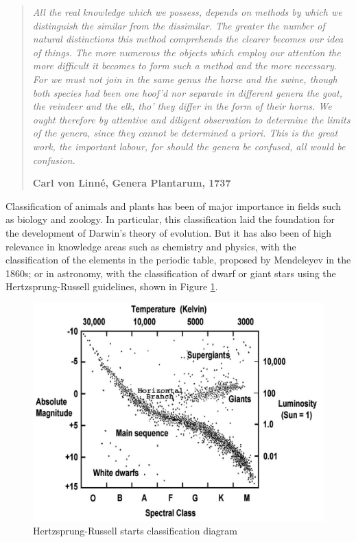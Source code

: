 \begin{quotation}{\slshape
		All the real knowledge which we possess, depends on methods by which we distinguish the similar from the dissimilar. The greater the number of natural distinctions this method comprehends the clearer becomes our idea of things. The
		more numerous the objects which employ our attention the more difficult it becomes to
		form such a method and the more necessary.
		For we must not join in the same genus the horse and the swine, though both species
		had been one hoof’d nor separate in different genera the goat, the reindeer and the elk,
		tho’ they differ in the form of their horns. We ought therefore by attentive and diligent
		observation to determine the limits of the genera, since they cannot be determined a
		priori. This is the great work, the important labour, for should the genera be confused,
		all would be confusion.} 
		\begin{flushright}
			\textbf{Carl von Linné, Genera Plantarum, 1737}
		\end{flushright}
\end{quotation}

Classification of animals and plants has been of major importance in fields such as biology and zoology. In particular, this classification laid the foundation for the development of Darwin's theory of evolution. But it has also been of high relevance in knowledge areas such as chemistry and physics, with the classification of the elements in the periodic table, proposed by Mendeleyev in the 1860s; or in astronomy, with the classification of dwarf or giant stars using the Hertzsprung-Russell guidelines, shown in Figure \ref{fig:intro_HRdiagram}.

\begin{figure}[!h]
	\centering
	\includegraphics[scale=0.35]{gfx/Intro/HR_diagram} 
	\caption[Hertzsprung-Russell starts classification diagram]{Hertzsprung-Russell starts classification diagram}\label{fig:intro_HRdiagram}
\end{figure}

